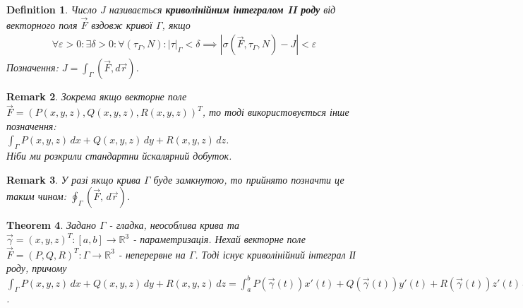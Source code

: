 \documentclass[a4paper, 10pt]{article}
\theoremstyle{theoremdd}
\newtheorem{theorem}{Theorem}[subsection]
\theoremstyle{theoremdd}
\newtheorem{definition}[theorem]{Definition}
\theoremstyle{theoremdd}
\theoremstyle{theoremdd}
\theoremstyle{theoremdd}
\newtheorem{proposition}[theorem]{Proposition}
\theoremstyle{theoremdd}
\newtheorem{remark}[theorem]{Remark}
\theoremstyle{theoremdd}
\theoremstyle{theoremdd}
\newcommand\Norm[1]{\left\lVert#1\right\rVert}
\begin{document}
\begin{definition}
Число $J$ називається \textbf{криволінійним інтегралом II роду} від векторного поля $\vec{F}$ вздовж кривої $\Gamma$, якщо
\begin{align*}
\forall \varepsilon > 0: \exists \delta > 0: \forall (\tau_\Gamma, N): |\tau|_\Gamma < \delta \implies |\sigma(\vec{F},\tau_\Gamma, N) - J| < \varepsilon
\end{align*}
Позначення: $J = \displaystyle\int_\Gamma (\vec{F}, d\vec{r})$.
\end{definition}

\iffalse
\begin{proposition}
$\displaystyle\int_{\Gamma} (\vec{F},d\vec{r}) = \int_{\Gamma} (\vec{F}, \vec{l})\,dl$.\\
Тепер тут $(\vec{F},\vec{l}) (x,y,z)$ - це скалярна функція $\Gamma \to \mathbb{R}$, а також $\vec{l}(\vec{\gamma}(t)) = \dfrac{\vec{\gamma}'(t)}{\Norm{\vec{\gamma}'(t)}}$.
\end{proposition}
\fi

\begin{remark}
Зокрема якщо векторне поле $\vec{F} = ( P(x,y,z), Q(x,y,z), R(x,y,z) )^T$, то тоді використовується інше позначення:\\
$\displaystyle\int_\Gamma P(x,y,z)\,dx + Q(x,y,z)\,dy + R(x,y,z)\,dz$.\\
Ніби ми розкрили стандартни йскалярний добуток.
\end{remark}

\begin{remark}
У разі якщо крива $\Gamma$ буде замкнутою, то прийнято позначти це таким чином: $\displaystyle\oint_\Gamma (\vec{F}, \,d\vec{r})$.
\end{remark}

\begin{theorem}
Задано $\Gamma$ - гладка, неособлива крива та $\vec{\gamma} = (x,y,z)^T: [a,b] \to \mathbb{R}^3$ - параметризація. Нехай векторне поле $\vec{F} = (P,Q,R)^T: \Gamma \to \mathbb{R}^3$ - неперервне на $\Gamma$. Тоді існує криволінійний інтеграл ІІ роду, причому\\
$\displaystyle\int_\Gamma P(x,y,z)\,dx + Q(x,y,z)\,dy + R(x,y,z)\,dz = \int_a^b P(\vec{\gamma}(t))x'(t) + Q(\vec{\gamma}(t))y'(t) + R(\vec{\gamma}(t))z'(t)\,dt$.
\end{theorem}
\end{document}
